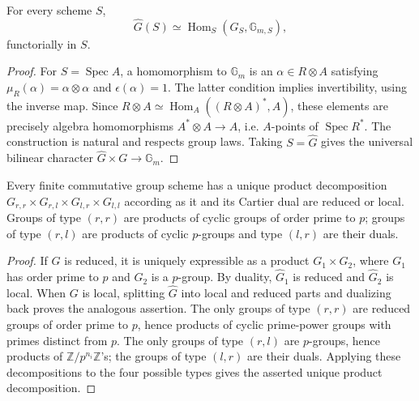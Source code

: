 \begin{theorem}
\label{mumford-thm-cartier-duality}
For every scheme $S$,
\[
\widehat G(S)\simeq\operatorname{Hom}_S(G_S,\mathbb G_{m,S}),
\]
functorially in $S$.
\end{theorem}
\begin{proof}
For $S=\operatorname{Spec}A$, a homomorphism to $\mathbb G_m$ is an
$\alpha\in R\otimes A$ satisfying
$\mu_R(\alpha)=\alpha\otimes\alpha$ and $\epsilon(\alpha)=1$.
The latter condition implies invertibility, using the inverse map. Since
$R\otimes A\simeq\operatorname{Hom}_A((R\otimes A)^*,A)$, these elements
are precisely algebra homomorphisms $A^*\otimes A\to A$, i.e. $A$-points of
$\operatorname{Spec}R^*$. The construction is natural and respects group
laws. Taking $S=\widehat G$ gives the universal bilinear character
$\widehat G\times G\to\mathbb G_m$.
\end{proof}

\begin{proposition}
\label{mumford-prop-cartier-local-reduced}
Every finite commutative group scheme has a unique product decomposition
$G_{r,r}\times G_{r,l}\times G_{l,r}\times G_{l,l}$ according as it and
its Cartier dual are reduced or local. Groups of type $(r,r)$ are products
of cyclic groups of order prime to $p$; groups of type $(r,l)$ are products
of cyclic $p$-groups and type $(l,r)$ are their duals.
\end{proposition}
\begin{proof}
If $G$ is reduced, it is uniquely expressible as a product $G_1\times G_2$,
where $G_1$ has order prime to $p$ and $G_2$ is a $p$-group. By duality,
$\widehat G_1$ is reduced and $\widehat G_2$ is local. When $G$ is local,
splitting $\widehat G$ into local and reduced parts and dualizing back proves
the analogous assertion. The only groups of type $(r,r)$ are reduced groups
of order prime to $p$, hence products of cyclic prime-power groups with
primes distinct from $p$. The only groups of type $(r,l)$ are $p$-groups,
hence products of $\mathbb Z/p^{n_i}\mathbb Z$'s; the groups of type $(l,r)$
are their duals. Applying these decompositions to the four possible types
gives the asserted unique product decomposition.
\end{proof}

